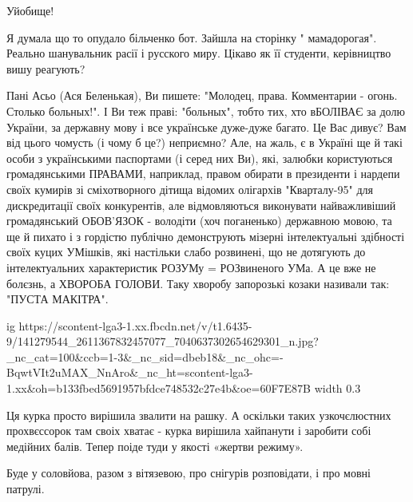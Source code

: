 
Уйобище!


Я думала що то опудало більченко бот. Зайшла на сторінку " мамадорогая".
Реально шанувальник расії і русского миру. Цікаво як її студенти, керівництво
вишу реагують?



Пані Асьо (Ася Беленькая), Ви пишете: "Молодец, права. Комментарии - огонь.
Столько больных!". І Ви теж праві: "больных", тобто тих, хто вБОЛІВАЄ за долю
України, за державну мову і все українське дуже-дуже багато. Це Вас дивує? Вам
від цього чомусть (і чому б це?) неприємно? Але, на жаль, є в Україні ще й такі
особи з українськими паспортами (і серед них Ви), які, залюбки користуються
громадянськими ПРАВАМИ, наприклад, правом обирати в президенти і нардепи своїх
кумирів зі сміхотворного дітища відомих олігархів "Кварталу-95" для
дискредитації своїх конкурентів, але відмовляються виконувати найважливіший
громадянський ОБОВ'ЯЗОК - володіти (хоч поганенько) державною мовою, та ще й
пихато і з гордістю публічно демонструють мізерні інтелектуальні здібності
своїх куцих УМішків, які настільки слабо розвинені, що не дотягують до
інтелектуальних характеристик РОЗУМу = РОЗвиненого УМа. А це вже не болєзнь, а
ХВОРОБА ГОЛОВИ. Таку хворобу запорозькі козаки називали так: "ПУСТА МАКІТРА".

\ifcmt
  ig https://scontent-lga3-1.xx.fbcdn.net/v/t1.6435-9/141279544_2611367832457077_7040637302654629301_n.jpg?_nc_cat=100&ccb=1-3&_nc_sid=dbeb18&_nc_ohc=-BqwtVIt2uMAX_NnAro&_nc_ht=scontent-lga3-1.xx&oh=b133fbed5691957bfdce748532c27e4b&oe=60F7E87B
  width 0.3
\fi



Ця курка просто вирішила звалити на рашку. А оскільки таких узкочєлюстних
прохвєссорок там своіх хватає - курка вирішила хайпанути і заробити собі
медійних балів. Тепер поіде туди у якості «жертви режиму».

Буде у соловйова, разом з вітязевою, про снігурів розповідати, і про мовні
патрулі.

